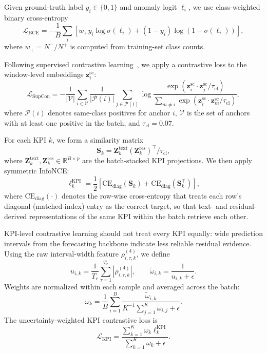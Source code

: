 \documentclass[conference]{IEEEtran}
\begin{document}
Given ground-truth label $y_i \in \{0,1\}$ and anomaly logit $\ell_i$, we use class-weighted binary cross-entropy
\begin{equation}
\mathcal{L}_{\mathrm{BCE}}
=
-\frac{1}{B}
\sum_i
\left[
w_+ y_i \log \sigma(\ell_i)
+
(1-y_i)\log(1-\sigma(\ell_i))
\right],
\end{equation}
where $w_+=N^{-}/N^{+}$ is computed from training-set class counts.

Following supervised contrastive learning~\cite{khosla2020supervised}, we apply a contrastive loss to the window-level embeddings $\mathbf{z}^{\mathrm{sc}}_i$:
\begin{equation}
\mathcal{L}_{\mathrm{SupCon}}
=
-\frac{1}{|\mathcal{V}|}
\sum_{i\in\mathcal{V}}
\frac{1}{|\mathcal{P}(i)|}
\sum_{j\in\mathcal{P}(i)}
\log
\frac{
\exp(\mathbf{z}^{\mathrm{sc}}_i \cdot \mathbf{z}^{\mathrm{sc}}_j/\tau_{\mathrm{cl}})
}{
\sum_{m\neq i}
\exp(\mathbf{z}^{\mathrm{sc}}_i \cdot \mathbf{z}^{\mathrm{sc}}_m/\tau_{\mathrm{cl}})
},
\end{equation}
where $\mathcal{P}(i)$ denotes same-class positives for anchor $i$, $\mathcal{V}$ is the set of anchors with at least one positive in the batch, and $\tau_{\mathrm{cl}}=0.07$.

For each KPI $k$, we form a similarity matrix
\begin{equation}
\mathbf{S}_k
=
\mathbf{Z}^{\mathrm{text}}_k
(\mathbf{Z}^{\mathrm{res}}_k)^\top
/
\tau_{\mathrm{cl}},
\end{equation}
where $\mathbf{Z}^{\mathrm{text}}_k,\mathbf{Z}^{\mathrm{res}}_k \in \mathbb{R}^{B\times p}$ are the batch-stacked KPI projections. We then apply symmetric InfoNCE:
\begin{equation}
\ell^{\mathrm{KPI}}_k
=
\frac{1}{2}
\left[
\mathrm{CE}_{\mathrm{diag}}(\mathbf{S}_k)
+
\mathrm{CE}_{\mathrm{diag}}(\mathbf{S}_k^\top)
\right],
\end{equation}
where $\mathrm{CE}_{\mathrm{diag}}(\cdot)$ denotes the row-wise cross-entropy that treats each row's diagonal (matched-index) entry as the correct target, so that text- and residual-derived representations of the same KPI within the batch retrieve each other.

KPI-level contrastive learning should not treat every KPI equally: wide prediction intervals from the forecasting backbone indicate less reliable residual evidence. Using the raw interval-width feature $\rho^{(4)}_{i,\tau,k}$, we define
\begin{equation}
u_{i,k}
=
\frac{1}{T_r}
\sum_{\tau=1}^{T_r}
|\rho^{(4)}_{i,\tau,k}|,
\qquad
\tilde{\omega}_{i,k}
=
\frac{1}{u_{i,k}+\epsilon}.
\end{equation}
Weights are normalized within each sample and averaged across the batch:
\begin{equation}
\omega_k
=
\frac{1}{B}
\sum_{i=1}^{B}
\frac{
\tilde{\omega}_{i,k}
}{
K^{-1}\sum_{j=1}^{K}\tilde{\omega}_{i,j}+\epsilon
}.
\end{equation}
The uncertainty-weighted KPI contrastive loss is
\begin{equation}
\mathcal{L}_{\mathrm{KPI}}
=
\frac{
\sum_{k=1}^{K}
\omega_k \ell^{\mathrm{KPI}}_k
}{
\sum_{k=1}^{K}
\omega_k + \epsilon
}.
\end{equation}
\end{document}
